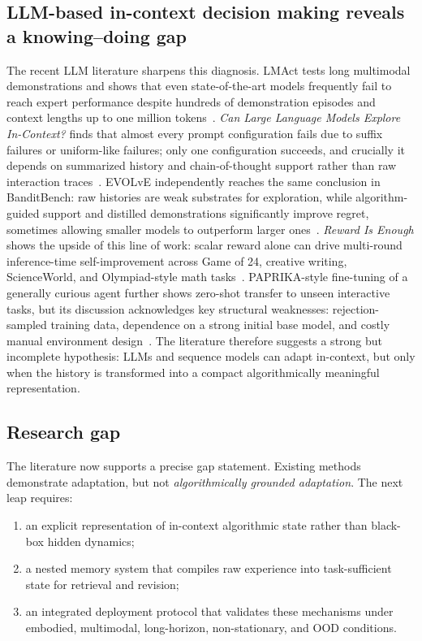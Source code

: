 \documentclass[10pt,twocolumn,letterpaper]{article}
\begin{document}
\subsection{LLM-based in-context decision making reveals a knowing--doing gap}
The recent LLM literature sharpens this diagnosis. LMAct tests long multimodal demonstrations and shows that even state-of-the-art models frequently fail to reach expert performance despite hundreds of demonstration episodes and context lengths up to one million tokens~\cite{ruoss2024lmact}. \emph{Can Large Language Models Explore In-Context?} finds that almost every prompt configuration fails due to suffix failures or uniform-like failures; only one configuration succeeds, and crucially it depends on summarized history and chain-of-thought support rather than raw interaction traces~\cite{krishnamurthy2024explore}. EVOLvE independently reaches the same conclusion in BanditBench: raw histories are weak substrates for exploration, while algorithm-guided support and distilled demonstrations significantly improve regret, sometimes allowing smaller models to outperform larger ones~\cite{nie2024evolve}. \emph{Reward Is Enough} shows the upside of this line of work: scalar reward alone can drive multi-round inference-time self-improvement across Game of 24, creative writing, ScienceWorld, and Olympiad-style math tasks~\cite{song2025reward}. PAPRIKA-style fine-tuning of a generally curious agent further shows zero-shot transfer to unseen interactive tasks, but its discussion acknowledges key structural weaknesses: rejection-sampled training data, dependence on a strong initial base model, and costly manual environment design~\cite{tajwar2025curious}. The literature therefore suggests a strong but incomplete hypothesis: LLMs and sequence models can adapt in-context, but only when the history is transformed into a compact algorithmically meaningful representation.

\subsection{Research gap}
The literature now supports a precise gap statement. Existing methods demonstrate adaptation, but not \emph{algorithmically grounded adaptation}. The next leap requires:
\begin{enumerate}[leftmargin=1.3em]
\item an explicit representation of in-context algorithmic state rather than black-box hidden dynamics;
\item a nested memory system that compiles raw experience into task-sufficient state for retrieval and revision;
\item an integrated deployment protocol that validates these mechanisms under embodied, multimodal, long-horizon, non-stationary, and OOD conditions.
\end{enumerate}
\end{document}
